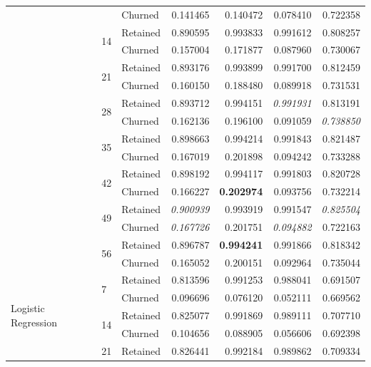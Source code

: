 \documentclass{kththesis}
\begin{document}
\begin{table}
\begin{tabular}{lllrrrr}
     &   & Churned &  0.141465 &  0.140472 &   0.078410 &  0.722358 \\
\cline{2-7}
     & \multirow{2}{*}{14} & Retained &  0.890595 &  0.993833 &   0.991612 &  0.808257 \\
     &   & Churned &  0.157004 &  0.171877 &   0.087960 &  0.730067 \\
\cline{2-7}
     & \multirow{2}{*}{21} & Retained &  0.893176 &  0.993899 &   0.991700 &  0.812459 \\
     &   & Churned &  0.160150 &  0.188480 &   0.089918 &  0.731531 \\
\cline{2-7}
     & \multirow{2}{*}{28} & Retained &  0.893712 &  0.994151 &   \textit{0.991931} &  0.813191 \\
     &   & Churned &  0.162136 &  0.196100 &   0.091059 &  \textit{0.738850} \\
\cline{2-7}
     & \multirow{2}{*}{35} & Retained &  0.898663 &  0.994214 &   0.991843 &  0.821487 \\
     &   & Churned &  0.167019 &  0.201898 &   0.094242 &  0.733288 \\
\cline{2-7}
     & \multirow{2}{*}{42} & Retained &  0.898192 &  0.994117 &   0.991803 &  0.820728 \\
     &   & Churned &  0.166227 &  \textbf{0.202974} &   0.093756 &  0.732214 \\
\cline{2-7}
     & \multirow{2}{*}{49} & Retained &  \textit{0.900939} &  0.993919 &   0.991547 &  \textit{0.825504} \\
     &   & Churned &  \textit{0.167726} &  0.201751 &   \textit{0.094882} &  0.722163 \\
\cline{2-7}
     & \multirow{2}{*}{56} & Retained &  0.896787 &  \textbf{0.994241} &   0.991866 &  0.818342 \\
     &   & Churned &  0.165052 &  0.200151 &   0.092964 &  0.735044 \\
\cline{1-7}
\cline{2-7}
\multirow{16}{*}{Logistic Regression} & \multirow{2}{*}{7} & Retained &  0.813596 &  0.991253 &   0.988041 &  0.691507 \\
     &   & Churned &  0.096696 &  0.076120 &   0.052111 &  0.669562 \\
\cline{2-7}
     & \multirow{2}{*}{14} & Retained &  0.825077 &  0.991869 &   0.989111 &  0.707710 \\
     &   & Churned &  0.104656 &  0.088905 &   0.056606 &  0.692398 \\
\cline{2-7}
     & \multirow{2}{*}{21} & Retained &  0.826441 &  0.992184 &   0.989862 &  0.709334 \\

\end{tabular}
\end{table}
\end{document}
